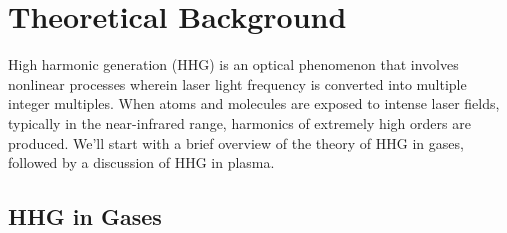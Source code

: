 \documentclass[12pt]{article}
\begin{document}
\section{Theoretical Background}
High harmonic generation (HHG) is an optical phenomenon that involves nonlinear processes wherein laser light frequency is converted into multiple integer multiples. When atoms and molecules are exposed to intense laser fields, typically in the near-infrared range, harmonics of extremely high orders are produced.\cite{hhg-book} We'll start with a brief overview of the theory of HHG in gases, followed by a discussion of HHG in plasma.

\subsection{HHG in Gases}


\end{document}
